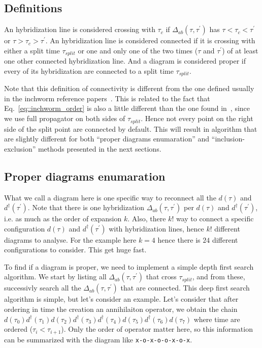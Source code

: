 \documentclass[10pt,letter]{article}
\begin{document}
\subsection{Definitions}

\label{sec::definition}


An hybridization line is considered crossing with $\tau_{c}$ if $\Delta_{ab}(\tau,\tau^\prime)$ has $\tau < \tau_{c} < \tau^\prime$ or  $\tau > \tau_{c} > \tau^\prime$. An hybridization line is considered connected if it is crossing with either a split time $\tau_{split}$ or one and only one of the two times ($\tau$ and $\tau^\prime$) of at least one other connected hybridization line. And a diagram is considered proper if every of its hybridization are connected to a split time $\tau_{split}$.

Note that this definition of connectivity is different from the one defined usually in the inchworm reference papers~\cite{boag_inclusion-exclusion_2018,antipov_currents_2017,eidelstein_multiorbital_2019}. This is related to the fact that Eq.~\eqref{eq::inchworm_order} is also a little different than the one found in~\cite{antipov_currents_2017}, since we use full propagator on both sides of $\tau_{split}$. Hence not every point on the right side of the split point are connected by default. This will result in algorithm that are slightly different for both ``proper diagrams enumaration'' and  ``inclusion-exclusion'' methods presented in the next sections.


\subsection{Proper diagrams enumaration}

\label{sec::proper}

What we call a diagram here is one specific way to reconnect all the $d(\tau)$ and $d^\dagger(\tau^\prime)$. Note that there is one hybridization $\Delta_{ab}(\tau,\tau^\prime)$  per $d(\tau)$ and $d^\dagger(\tau^\prime)$, i.e. as much as the order of expansion $k$. Also, there $k!$ way to connect a specific configuration $d(\tau)$ and $d^\dagger(\tau^\prime)$ with hybridization lines, hence $k!$ different diagrams to analyse. For the example here $k=4$ hence there is  $24$ different configurations to consider. This get huge fast.

To find if a diagram is proper, we need to implement a simple depth first search algorithm. We start by listing all $\Delta_{ab}(\tau,\tau^\prime)$  that cross $\tau_{split}$, and from these, successivly search all the $\Delta_{ab}(\tau,\tau^\prime)$ that are connected. This deep first search algorithm is simple, but let's consider an example. Let's consider that after ordering in time the creation an annihilaiton operator, we obtain the chain $d(\tau_0)d^\dagger(\tau_1)d(\tau_2)d^\dagger(\tau_3)d^\dagger(\tau_4)d(\tau_5)d^\dagger(\tau_6)d(\tau_7)$ where time are ordered ($\tau_i<\tau_{i+1}$).  Only the order of operator matter here, so this information can be summarized with the diagram like \Verb#x-o-x-o-o-x-o-x#. 
\end{document}
